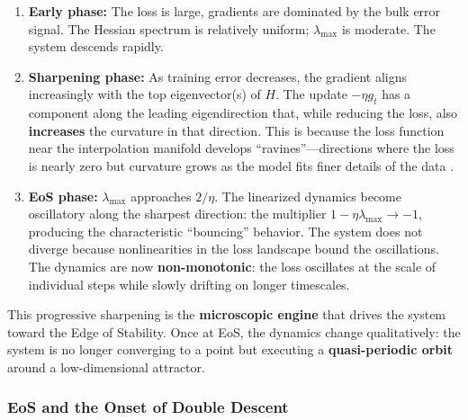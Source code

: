 \documentclass[
  journal=largetwo,
  year=2025,
  volume=37,
]{cup-journal}
\begin{document}
\begin{enumerate}
    \item \textbf{Early phase:} The loss is large, gradients are dominated by the bulk error signal. The Hessian spectrum is relatively uniform; $\lambda_{\max}$ is moderate. The system descends rapidly.

    \item \textbf{Sharpening phase:} As training error decreases, the gradient aligns increasingly with the top eigenvector(s) of $H$. The update $-\eta g_t$ has a component along the leading eigendirection that, while reducing the loss, also \textbf{increases} the curvature in that direction. This is because the loss function near the interpolation manifold develops ``ravines''---directions where the loss is nearly zero but curvature grows as the model fits finer details of the data \cite{cohen2021gradient}.

    \item \textbf{EoS phase:} $\lambda_{\max}$ approaches $2/\eta$. The linearized dynamics become oscillatory along the sharpest direction: the multiplier $1 - \eta \lambda_{\max} \to -1$, producing the characteristic ``bouncing'' behavior. The system does not diverge because nonlinearities in the loss landscape bound the oscillations. The dynamics are now \textbf{non-monotonic}: the loss oscillates at the scale of individual steps while slowly drifting on longer timescales.
\end{enumerate}

This progressive sharpening is the \textbf{microscopic engine} that drives the system toward the Edge of Stability. Once at EoS, the dynamics change qualitatively: the system is no longer converging to a point but executing a \textbf{quasi-periodic orbit} around a low-dimensional attractor.

\subsubsection{EoS and the Onset of Double Descent}
\end{document}
